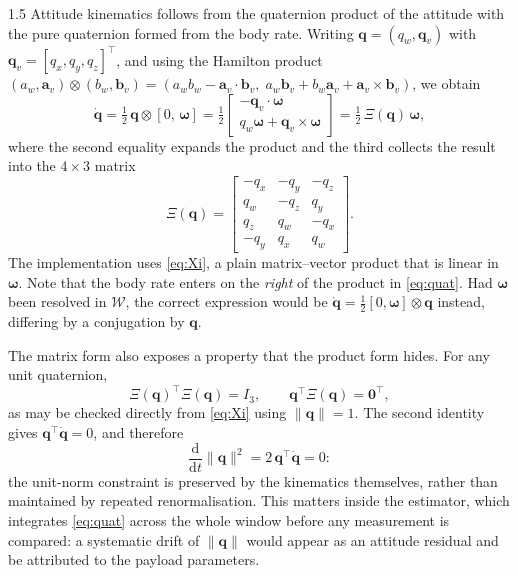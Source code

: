\begin{spacing}{1.5}
Attitude kinematics follows from the quaternion product of the attitude with the
pure quaternion formed from the body rate. Writing $\bm{q} = (q_w, \bm{q}_v)$
with $\bm{q}_v = [q_x, q_y, q_z]^{\!\top}$, and using the Hamilton product
$(a_w, \bm{a}_v) \otimes (b_w, \bm{b}_v) =
(a_w b_w - \bm{a}_v \!\cdot\! \bm{b}_v,\;
a_w \bm{b}_v + b_w \bm{a}_v + \bm{a}_v \!\times\! \bm{b}_v)$, we obtain
\begin{equation}
\dot{\bm{q}} = \tfrac{1}{2}\, \bm{q} \otimes [0,\, \bm{\omega}]
= \tfrac{1}{2}
\begin{bmatrix}
-\bm{q}_v \cdot \bm{\omega} \\[2pt]
q_w \bm{\omega} + \bm{q}_v \times \bm{\omega}
\end{bmatrix}
= \tfrac{1}{2}\, \Xi(\bm{q})\, \bm{\omega},
\label{eq:quat}
\end{equation}
where the second equality expands the product and the third collects the result
into the $4 \times 3$ matrix
\begin{equation}
\Xi(\bm{q}) =
\begin{bmatrix}
-q_x & -q_y & -q_z \\
 q_w & -q_z &  q_y \\
 q_z &  q_w & -q_x \\
-q_y &  q_x &  q_w
\end{bmatrix}.
\label{eq:Xi}
\end{equation}
The implementation uses \eqref{eq:Xi}, a plain matrix--vector product that is
linear in $\bm{\omega}$. Note that the body rate enters on the \emph{right} of
the product in \eqref{eq:quat}. Had $\bm{\omega}$ been resolved in
$\mathcal{W}$, the correct expression would be
$\dot{\bm{q}} = \tfrac{1}{2} [0, \bm{\omega}] \otimes \bm{q}$ instead, differing
by a conjugation by $\bm{q}$.

The matrix form also exposes a property that the product form hides. For any
unit quaternion,
\begin{equation}
\Xi(\bm{q})^{\!\top}\Xi(\bm{q}) = I_3,
\qquad
\bm{q}^{\!\top}\Xi(\bm{q}) = \bm{0}^{\!\top},
\label{eq:Xiprops}
\end{equation}
as may be checked directly from \eqref{eq:Xi} using $\lVert\bm{q}\rVert=1$. The
second identity gives $\bm{q}^{\!\top}\dot{\bm{q}} = 0$, and therefore
\begin{equation}
\frac{\mathrm{d}}{\mathrm{d}t}\lVert\bm{q}\rVert^2
= 2\,\bm{q}^{\!\top}\dot{\bm{q}} = 0 :
\label{eq:normconserve}
\end{equation}
the unit-norm constraint is preserved by the kinematics themselves, rather than
maintained by repeated renormalisation. This matters inside the estimator, which
integrates \eqref{eq:quat} across the whole window before any measurement is
compared: a systematic drift of $\lVert\bm{q}\rVert$ would appear as an attitude
residual and be attributed to the payload parameters.


\end{spacing}

